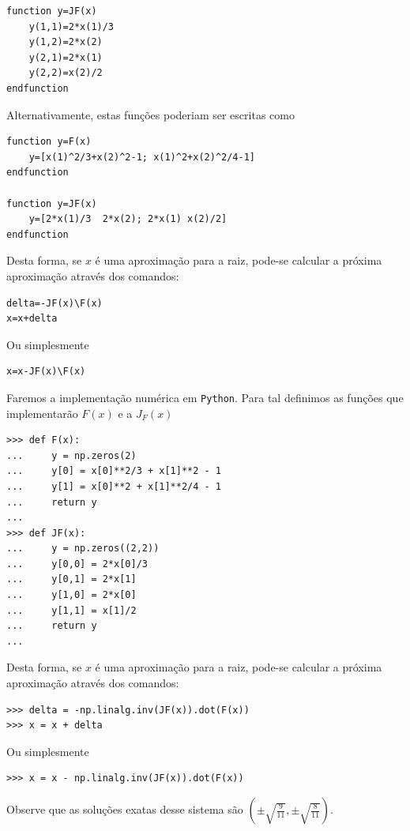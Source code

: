\begin{ex}
\begin{verbatim}
function y=JF(x)
    y(1,1)=2*x(1)/3
    y(1,2)=2*x(2)
    y(2,1)=2*x(1)
    y(2,2)=x(2)/2
endfunction
\end{verbatim}
Alternativamente, estas funções poderiam ser escritas como
\begin{verbatim}
function y=F(x)
    y=[x(1)^2/3+x(2)^2-1; x(1)^2+x(2)^2/4-1]
endfunction

function y=JF(x)
    y=[2*x(1)/3  2*x(2); 2*x(1) x(2)/2]
endfunction
\end{verbatim}
Desta forma, se $x$ é uma aproximação para a raiz, pode-se calcular a próxima aproximação através dos comandos:
\begin{verbatim}
delta=-JF(x)\F(x)
x=x+delta
\end{verbatim}
Ou simplesmente
\begin{verbatim}
x=x-JF(x)\F(x)
\end{verbatim}
\fi
\ifispython
Faremos a implementação numérica em \verb+Python+. Para tal definimos as funções que implementarão $F(x)$ e a $J_F(x)$
\begin{verbatim}
>>> def F(x):
...     y = np.zeros(2)
...     y[0] = x[0]**2/3 + x[1]**2 - 1
...     y[1] = x[0]**2 + x[1]**2/4 - 1
...     return y
... 
>>> def JF(x):
...     y = np.zeros((2,2))
...     y[0,0] = 2*x[0]/3
...     y[0,1] = 2*x[1]
...     y[1,0] = 2*x[0]
...     y[1,1] = x[1]/2
...     return y
... 
\end{verbatim}
Desta forma, se $x$ é uma aproximação para a raiz, pode-se calcular a próxima aproximação através dos comandos:
\begin{verbatim}
>>> delta = -np.linalg.inv(JF(x)).dot(F(x))
>>> x = x + delta
\end{verbatim}
Ou simplesmente
\begin{verbatim}
>>> x = x - np.linalg.inv(JF(x)).dot(F(x))
\end{verbatim}
\fi
Observe que as soluções exatas desse sistema são $\left(\pm \sqrt{\frac{9}{11}},\pm \sqrt{\frac{8}{11}}\right)$.
\end{ex}


